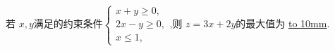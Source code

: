 \documentclass[class=ctexart,crop=false]{standalone}
\begin{document}
若 $x,y$满足的约束条件$\begin{cases}
    x+y\geqslant0,\\
    2x-y\geqslant0,\\
    x\leqslant1,
\end{cases}$,则 $z=3x+2y$的最大值为 \underline{\hbox to 10mm{}}.
\end{document}

